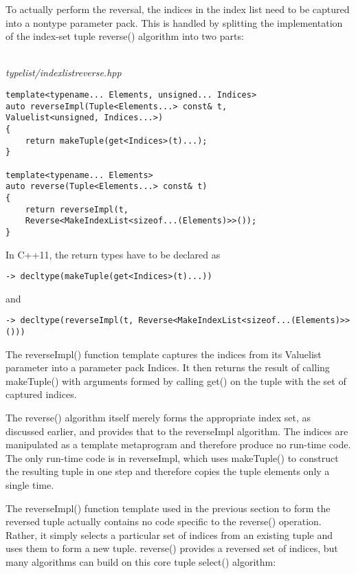 To actually perform the reversal, the indices in the index list need to be captured into a nontype parameter pack. This is handled by splitting the implementation of the index-set tuple reverse() algorithm into two parts:

\hspace*{\fill} \\ %
\noindent
\textit{typelist/indexlistreverse.hpp}
\begin{lstlisting}[style=styleCXX]
template<typename... Elements, unsigned... Indices>
auto reverseImpl(Tuple<Elements...> const& t,
Valuelist<unsigned, Indices...>)
{
	return makeTuple(get<Indices>(t)...);
}

template<typename... Elements>
auto reverse(Tuple<Elements...> const& t)
{
	return reverseImpl(t,
	Reverse<MakeIndexList<sizeof...(Elements)>>());
}
\end{lstlisting}

In C++11, the return types have to be declared as

\begin{lstlisting}[style=styleCXX]
-> decltype(makeTuple(get<Indices>(t)...))
\end{lstlisting}

and

\begin{lstlisting}[style=styleCXX]
-> decltype(reverseImpl(t, Reverse<MakeIndexList<sizeof...(Elements)>>()))
\end{lstlisting}

The reverseImpl() function template captures the indices from its Valuelist parameter into a parameter pack Indices. It then returns the result of calling makeTuple() with arguments formed by calling get() on the tuple with the set of captured indices.

The reverse() algorithm itself merely forms the appropriate index set, as discussed earlier, and provides that to the reverseImpl algorithm. The indices are manipulated as a template metaprogram and therefore produce no run-time code. The only run-time code is in reverseImpl, which uses makeTuple() to construct the resulting tuple in one step and therefore copies the tuple elements only a single time.


The reverseImpl() function template used in the previous section to form the reversed tuple actually contains no code specific to the reverse() operation. Rather, it simply selects a particular set of indices from an existing tuple and uses them to form a new tuple. reverse() provides a reversed set of indices, but many algorithms can build on this core tuple select() algorithm:

